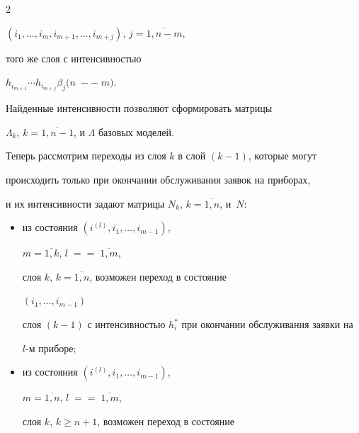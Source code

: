\begin{multicols}{2}
\begin{itemize}
$(i_1,\ldots,i_{m},i_{m+1},\ldots,i_{m+j})$, $j=\overline{1,n-m}$,


того же слоя с интенсивностью


$h_{i_{m+1}}\cdots h_{i_{m+j}}\beta_j(n\;-$\linebreak $-\;m)$.  %


\end{itemize}











Найденные интенсивности позволяют сформировать матрицы


$\Lambda_k$, $k=\overline{1,n-1}$, и $\Lambda$ базовых моделей.





Теперь рассмотрим переходы из слоя $k$ в слой $(k-1)$, которые могут


происходить только при окончании обслуживания заявок на приборах,


и их интенсивности задают матрицы $N_k$, $k=\overline{1,n}$, и~$N$:


\begin{itemize}


\item из состояния $\left (i^{(l)},i_1,\ldots,i_{m-1}\right )$,


$m=\overline{1,k}$, $l\;=$\linebreak $=\;\overline{1,m}$,


слоя $k$, $k=\overline{1,n}$, возможен переход в состояние


$\left (i_1,\ldots, i_{m-1}\right )$             %


слоя $(k-1)$ с интенсивностью $h_i^*$ при окончании обслуживания заявки на


$l$-м приборе;


\item


из состояния $\left (i^{(l)},i_1,\ldots,i_{m-1}\right )$,


$m=\overline{1,n}$, $l\;=$\linebreak $=\;\overline{1,m}$,


слоя $k$, $k\ge n+1$, возможен переход в состояние



\end{itemize}
\end{multicols}
